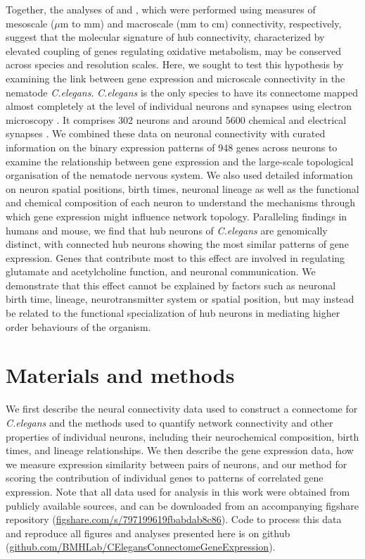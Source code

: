 Together, the analyses of \citet{Fulcher2016} and \citet{Vertes2016b}, which were performed using measures of mesoscale ($\mu$m to mm) and macroscale (mm to cm) connectivity, respectively, suggest that the molecular signature of hub connectivity, characterized by elevated coupling of genes regulating oxidative metabolism, may be conserved across species and resolution scales.
Here, we sought to test this hypothesis by examining the link between gene expression and microscale connectivity in the nematode \emph{C.elegans}.
\emph{C.elegans} is the only species to have its connectome mapped almost completely at the level of individual neurons and synapses using electron microscopy \citep{White1986, Varshney2011}.
It comprises 302 neurons and around 5600 chemical and electrical synapses \citep{White1986}.
We combined these data on neuronal connectivity with curated information on the binary expression patterns of 948 genes across neurons to examine the relationship between gene expression and the large-scale topological organisation of the nematode nervous system.
We also used detailed information on neuron spatial positions, birth times, neuronal lineage as well as the functional and chemical composition of each neuron to understand the mechanisms through which gene expression might influence network topology.
Paralleling findings in humans and mouse, we find that hub neurons of \emph{C.elegans} are genomically distinct, with connected hub neurons showing the most similar patterns of gene expression.
Genes that contribute most to this effect are involved in regulating glutamate and acetylcholine function, and neuronal communication.
We demonstrate that this effect cannot be explained by factors such as neuronal birth time, lineage, neurotransmitter system or spatial position, but may instead be related to the functional specialization of hub neurons in mediating higher order behaviours of the organism.

\section{Materials and methods}
\label{Ch2Methods}

We first describe the neural connectivity data used to construct a connectome for \textit{C.elegans} and the methods used to quantify network connectivity and other properties of individual neurons, including their neurochemical composition, birth times, and lineage relationships.
We then describe the gene expression data, how we measure expression similarity between pairs of neurons, and our method for scoring the contribution of individual genes to patterns of correlated gene expression.
Note that all data used for analysis in this work were obtained from publicly available sources, and can be downloaded from an accompanying figshare repository (\url{figshare.com/s/797199619fbabdab8c86}).
Code to process this data and reproduce all figures and analyses presented here is on github (\url{github.com/BMHLab/CElegansConnectomeGeneExpression}).


